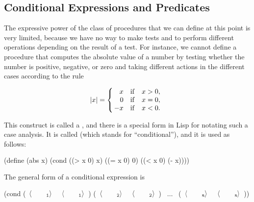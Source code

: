 \subsection{Conditional Expressions and Predicates}
\label{Section 1.1.6}

The expressive power of the class of procedures that we can define at this
point is very limited, because we have no way to make tests and to perform
different operations depending on the result of a test.  For instance, we
cannot define a procedure that computes the absolute value of a number by
testing whether the number is positive, negative, or zero and taking different
actions in the different cases according to the rule
\begin{comment}

\begin{example}
      /
      |   x  if x > 0
|x| = <   0  if x = 0
      |  -x  if x < 0
      \
\end{example}

\end{comment}

$$
 |x| = \left\{ \begin{array}{r@{\quad \mathrm{if} \quad}l}
        x  &  x > 0, \\
	0  &  x = 0, \\
  \!\! -x  &  x < 0. \end{array} \right.
$$

This construct is called a , and there is a special form
in Lisp for notating such a case analysis.  It is called \code{cond} (which
stands for ``conditional''), and it is used as follows:

\begin{scheme}
(define (abs x)
  (cond ((> x 0) x)
        ((= x 0) 0)
        ((< x 0) (- x))))
\end{scheme}

\noindent
The general form of a conditional expression is

\begin{scheme}
(cond (~\( \dark \langle \)~~~~\( \dark _{\mono{1}}\rangle \)~ ~\( \dark \langle \)~~~~\( \dark _{\mono{1}}\rangle \)~)
      (~\( \dark \langle \)~~\var{\dark p}~~\( \dark _{\mono{2}}\rangle \)~ ~\( \dark \langle \)~~\var{\dark e}~~\( \dark _{\mono{2}}\rangle \)~)
      ~\( \dots \)~
      (~\( \dark \langle \)~~~~\( \dark _{\monoit{n}}\rangle \)~ ~\( \dark \langle \)~~~~\( \dark _{\monoit{n}}\rangle \)~))
\end{scheme}

